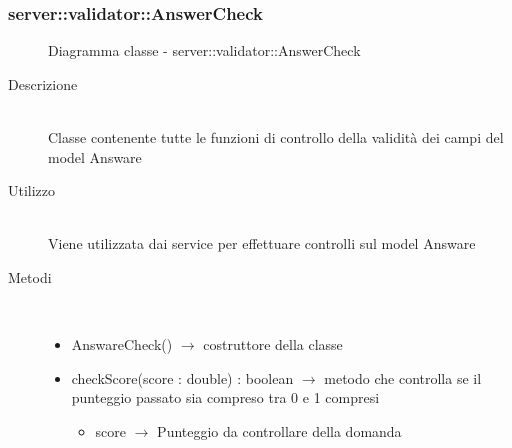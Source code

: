 \subsubsection[AnswerCheck]{server::validator::AnswerCheck}
\begin{figure}[H]
	\centering
	\caption{Diagramma classe - server::validator::AnswerCheck}
\end{figure}\begin{description}
\item[Descrizione] \hfill \\
Classe contenente tutte le funzioni di controllo della validità dei campi del model Answare
\item[Utilizzo] \hfill \\
Viene utilizzata dai service per effettuare controlli sul model Answare
\item[Metodi] \hfill \\
\vspace{-7mm}
\begin{itemize}
	\item AnswareCheck() $\rightarrow$ costruttore della classe
	\item checkScore(score : double) : boolean $\rightarrow$ metodo che controlla se il punteggio passato sia compreso tra 0 e 1 compresi\begin{itemize}
		\item score $\rightarrow$ Punteggio da controllare della domanda
	\end{itemize}
	
\end{itemize}

\end{description}
